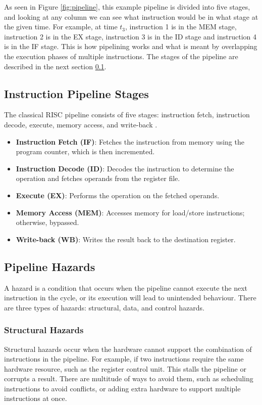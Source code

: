 As seen in Figure \ref{fig:pipeline}, this example pipeline is divided into five stages, and looking at any column we can see what instruction would be in what stage at the given time. For example, at time $t_3$, instruction 1 is in the MEM stage, instruction 2 is in the EX stage, instruction 3 is in the ID stage and instruction 4 is in the IF stage. This is how pipelining works and what is meant by overlapping the execution phases of multiple instructions. The stages of the pipeline are described in the next section \ref{sec:pipeline_stages}.


\subsection {Instruction Pipeline Stages}\label{sec:pipeline_stages}
The classical RISC pipeline consists of five stages: instruction fetch, instruction decode, execute, memory access, and write-back \cite{enwiki:1255528196}\cite{he2023survey}. 

\begin{itemize}
     \item \textbf{Instruction Fetch (IF)}: Fetches the instruction from memory using the program counter, which is then incremented.
     \item \textbf{Instruction Decode (ID)}: Decodes the instruction to determine the operation and fetches operands from the register file.
     \item \textbf{Execute (EX)}: Performs the operation on the fetched operands.
     \item \textbf{Memory Access (MEM)}: Accesses memory for load/store instructions; otherwise, bypassed.
     \item \textbf{Write-back (WB)}: Writes the result back to the destination register.
\end{itemize}

\subsection {Pipeline Hazards}\label{sec:pipeline_hazards}
A hazard is a condition that occurs when the pipeline cannot execute the next instruction in the cycle, or its execution will lead to unintended behaviour. There are three types of hazards: structural, data, and control hazards.\cite{olanrewaju2017design}
\subsubsection {Structural Hazards}\label{sec:structural_hazards}
Structural hazards occur when the hardware cannot support the combination of instructions in the pipeline. For example, if two instructions require the same hardware resource, such as the register control unit.
This stalls the pipeline or corrupts a result.
There are multitude of ways to avoid them, such as scheduling instructions to avoid conflicts, or adding extra hardware to support multiple instructions at once.\cite{proebsting1994detecting}
